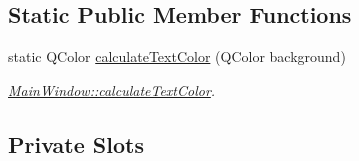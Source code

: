 \subsection*{Static Public Member Functions}
\begin{DoxyCompactItemize}
\item 
static Q\+Color \hyperlink{class_main_window_ae428cebea54284db9dc7416b3a3cb924}{calculate\+Text\+Color} (Q\+Color background)
\begin{DoxyCompactList}\small\item\em \hyperlink{class_main_window_ae428cebea54284db9dc7416b3a3cb924}{Main\+Window\+::calculate\+Text\+Color}. \end{DoxyCompactList}\end{DoxyCompactItemize}
\subsection*{Private Slots}
